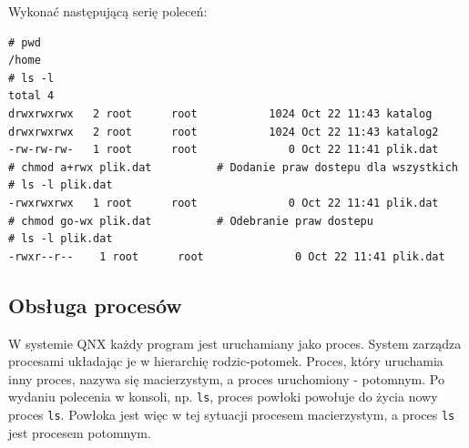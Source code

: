 \begin{example}
Wykonać następującą serię poleceń:

\begin{lstlisting}[style=MyBashStyle]
# pwd
/home
# ls -l
total 4
drwxrwxrwx   2 root      root           1024 Oct 22 11:43 katalog
drwxrwxrwx   2 root      root           1024 Oct 22 11:43 katalog2
-rw-rw-rw-   1 root      root              0 Oct 22 11:41 plik.dat
# chmod a+rwx plik.dat			# Dodanie praw dostepu dla wszystkich
# ls -l plik.dat
-rwxrwxrwx   1 root      root              0 Oct 22 11:41 plik.dat
# chmod go-wx plik.dat			# Odebranie praw dostepu
# ls -l plik.dat
-rwxr--r--    1 root      root              0 Oct 22 11:41 plik.dat
\end{lstlisting}



\end{example}


\subsection{Obsługa procesów}

W systemie QNX każdy program jest uruchamiany jako proces. System zarządza procesami układając je w hierarchię rodzic-potomek. Proces, który uruchamia inny proces, nazywa się macierzystym, a proces uruchomiony - potomnym. Po wydaniu polecenia w konsoli, np. \lstinline[style=MyBashStyle]{ls}, proces powłoki powołuje do życia nowy proces \lstinline[style=MyBashStyle]{ls}. Powłoka jest więc w tej sytuacji procesem macierzystym, a proces \lstinline[style=MyBashStyle]{ls} jest procesem potomnym.


